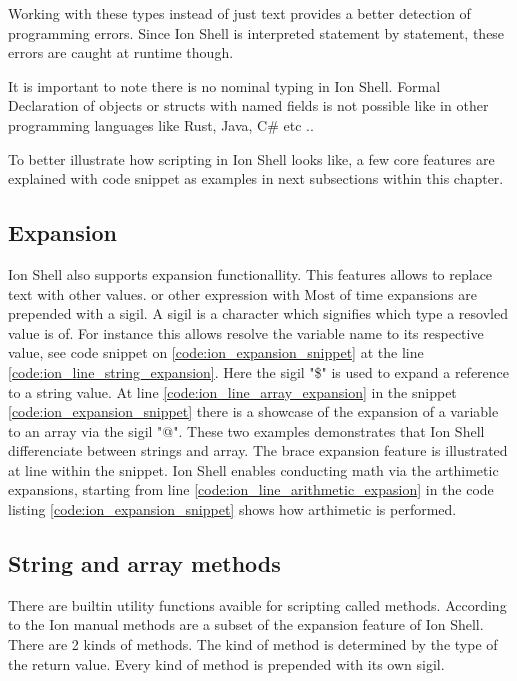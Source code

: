 Working with these types instead of just text provides a better detection of programming errors.
Since Ion Shell is interpreted statement by statement, these errors are caught at runtime though.

It is important to note there is no nominal typing in Ion Shell.
Formal Declaration of objects or structs with named fields is not possible like in other programming languages like Rust, Java, C\# etc ..

To better illustrate how scripting in Ion Shell looks like, a few core features are explained
with code snippet as examples in next subsections within this chapter.

\clearpage

\subsection{Expansion}\label{ion_shell_lang_expansion}

Ion Shell also supports expansion functionallity.
This features allows to replace text with other values. or other expression with
Most of time expansions are prepended with a sigil.
A sigil is a character which signifies which type a resovled value is of.
For instance this allows resolve the variable name to its respective value, see code snippet
on \ref{code:ion_expansion_snippet} at the line \ref{code:ion_line_string_expansion}.
Here the sigil "\$" is used to expand a reference to a string value.
At line \ref{code:ion_line_array_expansion} in the snippet \ref{code:ion_expansion_snippet}
there is a showcase of the expansion of a variable to an array via the sigil "@".
These two examples demonstrates that Ion Shell differenciate between strings and array.
The brace expansion feature is illustrated at line within the snippet.
Ion Shell enables conducting math via the arthimetic expansions,
starting from line \ref{code:ion_line_arithmetic_expasion} in the code listing \ref{code:ion_expansion_snippet} shows how arthimetic is performed.


\clearpage

\subsection{String and array methods}\label{ion_shell_lang_methods}

There are builtin utility functions avaible for scripting called methods.
According to the Ion manual methods are a subset of the expansion feature of Ion Shell.
There are 2 kinds of methods.
The kind of method is determined by the type of the return value.
Every kind of method is prepended with its own sigil.


